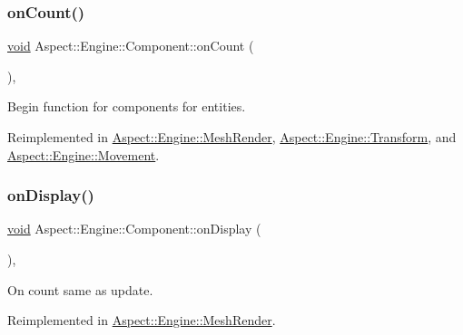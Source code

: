 \subsubsection{\texorpdfstring{on\+Count()}{onCount()}}
{\footnotesize\ttfamily \mbox{\hyperlink{_s_d_l__opengles2__gl2ext_8h_ae5d8fa23ad07c48bb609509eae494c95}{void}} Aspect\+::\+Engine\+::\+Component\+::on\+Count (\begin{DoxyParamCaption}{ }\end{DoxyParamCaption})\hspace{0.3cm}{\ttfamily [private]}, {\ttfamily [virtual]}}



Begin function for components for entities. 



Reimplemented in \mbox{\hyperlink{class_aspect_1_1_engine_1_1_mesh_render_aebaa5a60d373d3363a13336cfbaa4141}{Aspect\+::\+Engine\+::\+Mesh\+Render}}, \mbox{\hyperlink{class_aspect_1_1_engine_1_1_transform_acb53a815498eea17774cc42cfa6c03bd}{Aspect\+::\+Engine\+::\+Transform}}, and \mbox{\hyperlink{class_aspect_1_1_engine_1_1_movement_a4dc9ec0157d8d24dafeb69c3c3f60e23}{Aspect\+::\+Engine\+::\+Movement}}.

\mbox{\label{class_aspect_1_1_engine_1_1_component_ac67307dba854cdc9535a0de75e5a3d09}} 
\subsubsection{\texorpdfstring{on\+Display()}{onDisplay()}}
{\footnotesize\ttfamily \mbox{\hyperlink{_s_d_l__opengles2__gl2ext_8h_ae5d8fa23ad07c48bb609509eae494c95}{void}} Aspect\+::\+Engine\+::\+Component\+::on\+Display (\begin{DoxyParamCaption}{ }\end{DoxyParamCaption})\hspace{0.3cm}{\ttfamily [private]}, {\ttfamily [virtual]}}



On count same as update. 



Reimplemented in \mbox{\hyperlink{class_aspect_1_1_engine_1_1_mesh_render_aed81ecbd6bf1d63acb06171f729e4927}{Aspect\+::\+Engine\+::\+Mesh\+Render}}.

